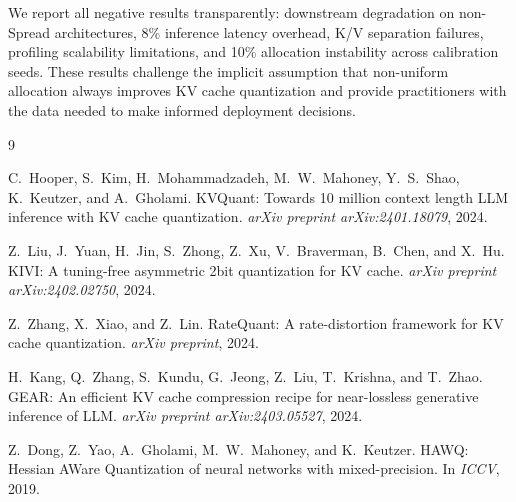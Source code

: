\documentclass[11pt,a4paper]{article}
\begin{document}
We report all negative results transparently: downstream degradation on non-Spread architectures, 8\% inference latency overhead, K/V separation failures, profiling scalability limitations, and 10\% allocation instability across calibration seeds.
These results challenge the implicit assumption that non-uniform allocation always improves KV cache quantization and provide practitioners with the data needed to make informed deployment decisions.


\begin{thebibliography}{9}

C.~Hooper, S.~Kim, H.~Mohammadzadeh, M.~W.~Mahoney, Y.~S.~Shao, K.~Keutzer, and A.~Gholami.
\newblock KVQuant: Towards 10 million context length LLM inference with KV cache quantization.
\newblock \emph{arXiv preprint arXiv:2401.18079}, 2024.

Z.~Liu, J.~Yuan, H.~Jin, S.~Zhong, Z.~Xu, V.~Braverman, B.~Chen, and X.~Hu.
\newblock KIVI: A tuning-free asymmetric 2bit quantization for KV cache.
\newblock \emph{arXiv preprint arXiv:2402.02750}, 2024.

Z.~Zhang, X.~Xiao, and Z.~Lin.
\newblock RateQuant: A rate-distortion framework for KV cache quantization.
\newblock \emph{arXiv preprint}, 2024.

H.~Kang, Q.~Zhang, S.~Kundu, G.~Jeong, Z.~Liu, T.~Krishna, and T.~Zhao.
\newblock GEAR: An efficient KV cache compression recipe for near-lossless generative inference of LLM.
\newblock \emph{arXiv preprint arXiv:2403.05527}, 2024.

Z.~Dong, Z.~Yao, A.~Gholami, M.~W.~Mahoney, and K.~Keutzer.
\newblock HAWQ: Hessian AWare Quantization of neural networks with mixed-precision.
\newblock In \emph{ICCV}, 2019.

\end{thebibliography}
\end{document}

